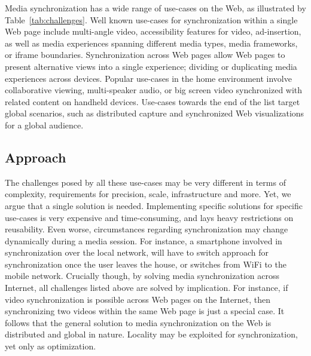 Media synchronization has a wide range of use-cases on the Web, as illustrated
by Table~\ref{tab:challenges}. Well known use-cases for synchronization within
a single Web page include multi-angle video, accessibility features for video,
ad-insertion, as well as media experiences spanning different media types,
media frameworks, or iframe boundaries. Synchronization across Web pages allow
Web pages to present alternative views into a single experience; dividing or
duplicating media experiences across devices. Popular use-cases in the home
environment involve collaborative viewing, multi-speaker audio, or big screen
video synchronized with related content on handheld devices. Use-cases towards
the end of the list target global scenarios, such as distributed capture and
synchronized Web visualizations for a global audience.

\subsection{Approach}

The challenges posed by all these use-cases may be very different in terms of
complexity, requirements for precision, scale, infrastructure and more. Yet,
we argue that a single solution is needed. Implementing specific solutions for
specific use-cases is very expensive and time-consuming, and lays heavy
restrictions on reusability. Even worse, circumstances regarding
synchronization may change dynamically during a media session. For instance, a
smartphone involved in synchronization over the local network, will have to
switch approach for synchronization once the user leaves the house, or
switches from WiFi to the mobile network. Crucially though, by solving media
synchronization across Internet, all challenges listed above are solved by
implication. For instance, if video synchronization is possible across Web
pages on the Internet, then synchronizing two videos within the same Web page
is just a special case. It follows that the general solution to media
synchronization on the Web is distributed and global in nature. Locality may
be exploited for synchronization, yet only as optimization.
